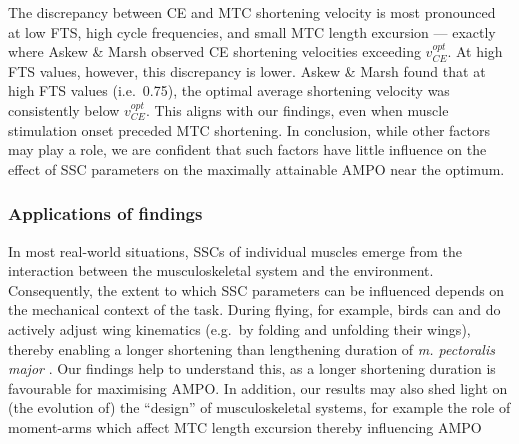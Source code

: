 \documentclass[
  10pt,
  letterpaper,
]{article}
\begin{document}
The discrepancy between CE and MTC shortening velocity is most
pronounced at low FTS, high cycle frequencies, and small MTC length
excursion --- exactly where {Askew \& Marsh \citep{askew_optimal_1998}}
observed CE shortening velocities exceeding \(v_{CE}^{opt}\). At high
FTS values, however, this discrepancy is lower. {Askew \& Marsh
\citep{askew_optimal_1998}} found that at high FTS values (i.e.~0.75),
the optimal average shortening velocity was consistently below
\(v_{CE}^{opt}\). This aligns with our findings, even when muscle
stimulation onset preceded MTC shortening. In conclusion, while other
factors may play a role, we are confident that such factors have little
influence on the effect of SSC parameters on the maximally attainable
AMPO near the optimum.

\subsubsection{Applications of findings}\label{applications-of-findings}

In most real-world situations, SSCs of individual muscles emerge from
the interaction between the musculoskeletal system and the environment.
Consequently, the extent to which SSC parameters can be influenced
depends on the mechanical context of the task. During flying, for
example, birds can and do actively adjust wing kinematics (e.g.~by
folding and unfolding their wings), thereby enabling a longer shortening
than lengthening duration of \emph{m. pectoralis major}
\citep[e.g.,][]{askew_mechanical_2001, biewener_vivo_1998, earls_kinematics_2000, ellerby_modulation_2007, jackson_scaling_2011, spedding_wake_1987, williamson_pectoralis_2001}.
Our findings help to understand this, as a longer shortening duration is
favourable for maximising AMPO. In addition, our results may also shed
light on (the evolution of) the ``design'' of musculoskeletal systems,
for example the role of moment-arms which affect MTC length excursion
thereby influencing AMPO \citep[e.g.][]{polet_optimal_2024}
\end{document}
